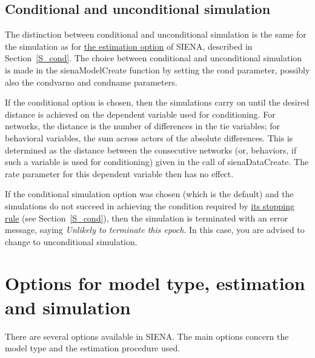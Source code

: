 \documentclass[a4paper,fleqn,11pt]{article}
\newcommand{\+}{\, + \,}
\newcommand{\si}{{\sf SIENA}}
\begin{document}
\subsection{Conditional and unconditional simulation}
\label{S_conds}

The distinction between conditional and unconditional simulation
is the same for the simulation as for
\hyperlink{T_S_cond}{the estimation option}
of \si, described in Section~\ref{S_cond}.
The choice between conditional and
unconditional simulation is
made in the \textsf{sienaModelCreate} function by setting the
\textsf{cond} parameter, possibly also the
\textsf{condvarno} and \textsf{condname} parameters.

If the conditional option is chosen, then the simulations
carry on until the desired distance is achieved on the dependent
variable used for conditioning.
For networks, the distance is the number of differences in the
tie variables; for behavioral variables, the sum
across actors of the absolute differences.
This is determined as the
distance between the consecutive networks (or, behaviors,
if such a variable is used for conditioning) given in the call of
\textsf{sienaDataCreate}.
The rate parameter for this dependent variable then
has no effect.

If the conditional simulation option was chosen (which is the
default) and the simulations do not succeed in achieving the
condition required by
\hyperlink{T_distance_stop}{its stopping rule}
(see Section~\ref{S_cond}), then the simulation is
terminated with an error message, saying
\emph{Unlikely to terminate this epoch}.
In this case, you are advised to change to unconditional simulation.

\iffalse
\newpage
\section[Options for model type, estimation and simulation]
        {Options for model type, estimation and simulation}
\label{S_options}

\hypertarget{T_S_options}{}
There are several options available in \si. The main options
concern the model type and the estimation procedure used.
\end{document}
